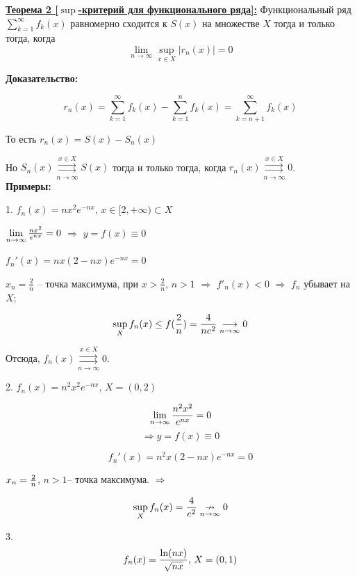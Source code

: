 \documentclass[a4paper,12pt]{article} %
\begin{document}
\underline{\textbf{Теорема 2 [$\sup$-критерий для функционального ряда]:}}\newline 
Функциональный ряд $\sum\limits_{k = 1}^{\infty}  f_k(x)$ равномерно сходится к $S(x)$ на множестве $X$ тогда и только тогда, когда $$\lim\limits_{n \rightarrow \infty} \sup_{x \in X} |r_n(x)| = 0$$

\textbf{Доказательство:} 

$$r_n(x) = \sum\limits_{k = 1}^{\infty}  f_k(x) -  \sum\limits_{k = 1}^{n}  f_k(x)= \sum\limits_{k = n+1}^{\infty}  f_k(x)$$ \newline

То есть $r_n(x)=S(x)-S_n(x)$ \newline

Но $S_n(x) \overset{x \in X}{\underset{n \rightarrow \infty}{\rightrightarrows}} S(x)$ тогда и только тогда, когда $r_n(x) \overset{x \in X}{\underset{n \rightarrow \infty}{\rightrightarrows}} 0$.\\

\textbf{Примеры:}

1. $f_n(x) = nx^2e^{-nx}$, $x \in [2, +\infty) \subset X$

$\lim\limits_{n \rightarrow \infty}{nx^2 \over e^{nx}} = 0$ $\Rightarrow$ $y=f(x) \equiv 0$

$f_n'(x) = nx(2-nx)e^{-nx} = 0$

\hspace*{5mm}$x_n = {\frac{2}{n}}$ -- точка максимума, при $x > {\frac{2}{n}}$, $n>1$ $\Rightarrow$ $f'_n(x) < 0$ $\Rightarrow$ $f_n$ убывает на $X$;

$$\sup_{X}f_n(x) \leq f({2\over n}) = {4\over ne^2} \underset{n \rightarrow \infty}{\longrightarrow} 0 $$

Отсюда, $f_n(x) \overset{x \in X}{\underset{n \rightarrow \infty}{\rightrightarrows}} 0$.

2. $f_n(x) = n^2x^2e^{-nx}$, $X = (0,2)$

$$\lim\limits_{n \rightarrow \infty}{n^2x^2 \over e^{nx}} = 0$$ $$\Rightarrow y=f(x) \equiv 0$$

$$f_n'(x) = n^2x(2-nx)e^{-nx} = 0$$

\hspace*{5mm}$x_n = { 2 \over n}$,  $n>1$-- точка максимума. $\Rightarrow$

$$\sup_{X}f_n(x) = {4\over e^2} \underset{n \rightarrow \infty}{\nrightarrow} 0 $$

3. $$f_n(x) = {{\ln(nx)} \over {\sqrt{nx}}} \text{, } X = (0,1)$$
\end{document}
